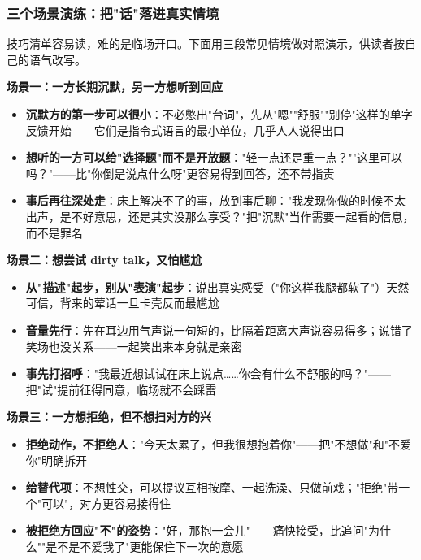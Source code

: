 \subsubsection{三个场景演练：把"话"落进真实情境}

技巧清单容易读，难的是临场开口。下面用三段常见情境做对照演示，供读者按自己的语气改写。

\vspace{0.5em}
\noindent\textbf{场景一：一方长期沉默，另一方想听到回应}

\begin{itemize}
	\item \textbf{沉默方的第一步可以很小}：不必憋出"台词"，先从"嗯""舒服""别停"这样的单字反馈开始——它们是指令式语言的最小单位，几乎人人说得出口
	\item \textbf{想听的一方可以给"选择题"而不是开放题}："轻一点还是重一点？""这里可以吗？"——比"你倒是说点什么呀"更容易得到回答，还不带指责
	\item \textbf{事后再往深处走}：床上解决不了的事，放到事后聊："我发现你做的时候不太出声，是不好意思，还是其实没那么享受？"把"沉默"当作需要一起看的信息，而不是罪名
\end{itemize}

\vspace{0.5em}
\noindent\textbf{场景二：想尝试 dirty talk，又怕尴尬}

\begin{itemize}
	\item \textbf{从"描述"起步，别从"表演"起步}：说出真实感受（"你这样我腿都软了"）天然可信，背来的荤话一旦卡壳反而最尴尬
	\item \textbf{音量先行}：先在耳边用气声说一句短的，比隔着距离大声说容易得多；说错了笑场也没关系——一起笑出来本身就是亲密
	\item \textbf{事先打招呼}："我最近想试试在床上说点……你会有什么不舒服的吗？"——把"试"提前征得同意，临场就不会踩雷
\end{itemize}

\vspace{0.5em}
\noindent\textbf{场景三：一方想拒绝，但不想扫对方的兴}

\begin{itemize}
	\item \textbf{拒绝动作，不拒绝人}："今天太累了，但我很想抱着你"——把"不想做"和"不爱你"明确拆开
	\item \textbf{给替代项}：不想性交，可以提议互相按摩、一起洗澡、只做前戏；"拒绝"带一个"可以"，对方更容易接得住
	\item \textbf{被拒绝方回应"不"的姿势}："好，那抱一会儿"——痛快接受，比追问"为什么""是不是不爱我了"更能保住下一次的意愿
\end{itemize}

